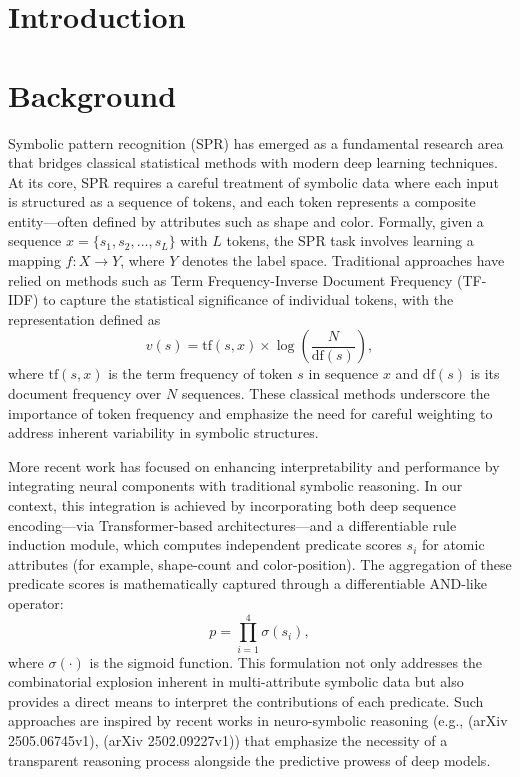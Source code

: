 \documentclass{article}
\begin{document}
\section{Introduction}


\section{Background}
Symbolic pattern recognition (SPR) has emerged as a fundamental research area that bridges classical statistical methods with modern deep learning techniques. At its core, SPR requires a careful treatment of symbolic data where each input is structured as a sequence of tokens, and each token represents a composite entity—often defined by attributes such as shape and color. Formally, given a sequence \( x = \{s_1, s_2, \ldots, s_L\} \) with \( L \) tokens, the SPR task involves learning a mapping \( f: X \rightarrow Y \), where \( Y \) denotes the label space. Traditional approaches have relied on methods such as Term Frequency-Inverse Document Frequency (TF-IDF) to capture the statistical significance of individual tokens, with the representation defined as
\[
v(s) = \text{tf}(s, x) \times \log\left(\frac{N}{\text{df}(s)}\right),
\]
where \( \text{tf}(s, x) \) is the term frequency of token \( s \) in sequence \( x \) and \( \text{df}(s) \) is its document frequency over \( N \) sequences. These classical methods underscore the importance of token frequency and emphasize the need for careful weighting to address inherent variability in symbolic structures.

More recent work has focused on enhancing interpretability and performance by integrating neural components with traditional symbolic reasoning. In our context, this integration is achieved by incorporating both deep sequence encoding—via Transformer-based architectures—and a differentiable rule induction module, which computes independent predicate scores \( s_i \) for atomic attributes (for example, shape-count and color-position). The aggregation of these predicate scores is mathematically captured through a differentiable AND-like operator:
\[
p = \prod_{i=1}^{4} \sigma(s_i),
\]
where \( \sigma(\cdot) \) is the sigmoid function. This formulation not only addresses the combinatorial explosion inherent in multi-attribute symbolic data but also provides a direct means to interpret the contributions of each predicate. Such approaches are inspired by recent works in neuro-symbolic reasoning (e.g., (arXiv 2505.06745v1), (arXiv 2502.09227v1)) that emphasize the necessity of a transparent reasoning process alongside the predictive prowess of deep models.
\end{document}
